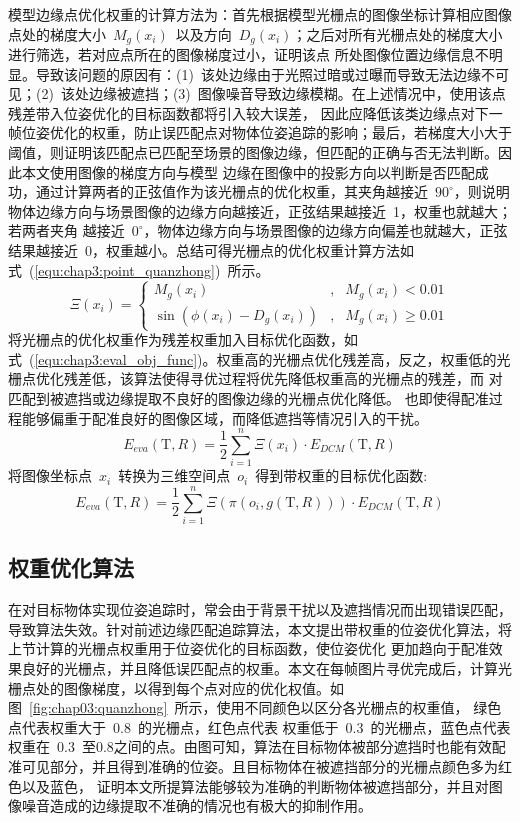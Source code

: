 模型边缘点优化权重的计算方法为：首先根据模型光栅点的图像坐标计算相应图像点处的梯度大小~$M_g(x_i)$~以及方向~$D_g(x_i)$；之后对所有光栅点处的梯度大小进行筛选，若对应点所在的图像梯度过小，证明该点
所处图像位置边缘信息不明显。导致该问题的原因有：(1)~该处边缘由于光照过暗或过曝而导致无法边缘不可见；(2)~该处边缘被遮挡；(3)~图像噪音导致边缘模糊。在上述情况中，使用该点残差带入位姿优化的目标函数都将引入较大误差，
因此应降低该类边缘点对下一帧位姿优化的权重，防止误匹配点对物体位姿追踪的影响；最后，若梯度大小大于阈值，则证明该匹配点已匹配至场景的图像边缘，但匹配的正确与否无法判断。因此本文使用图像的梯度方向与模型
边缘在图像中的投影方向以判断是否匹配成功，通过计算两者的正弦值作为该光栅点的优化权重，其夹角越接近~$90^\circ$，则说明物体边缘方向与场景图像的边缘方向越接近，正弦结果越接近~1，权重也就越大；若两者夹角
越接近~$0^\circ$，物体边缘方向与场景图像的边缘方向偏差也就越大，正弦结果越接近~0，权重越小。总结可得光栅点的优化权重计算方法如式~(\ref{equ:chap3:point_quanzhong})~所示。
\begin{equation}
  \label{equ:chap3:point_quanzhong}
  \Xi (x_i)=
  \left\{
    \begin{aligned}{}
    M_g(x_i)&,&M_g(x_i) < 0.01 \\
    \sin (\phi(x_i)-D_g(x_i))&,&M_g(x_i) \geq 0.01
    \end{aligned}
    \right.
\end{equation}
将光栅点的优化权重作为残差权重加入目标优化函数，如式~(\ref{equ:chap3:eval_obj_func})。权重高的光栅点优化残差高，反之，权重低的光栅点优化残差低，该算法使得寻优过程将优先降低权重高的光栅点的残差，而
对匹配到被遮挡或边缘提取不良好的图像边缘的光栅点优化降低。
也即使得配准过程能够偏重于配准良好的图像区域，而降低遮挡等情况引入的干扰。
\begin{equation}
\label{equ:chap3:eval_obj_func}
E_{eva}(\textrm{T},R)=\frac{1}{2}\sum_{i=1}^n \Xi(x_i)\cdot E_{DCM}(\textrm{T},R)
\end{equation}
将图像坐标点~$x_i$~转换为三维空间点~$o_i$~得到带权重的目标优化函数:
\begin{equation}
  \label{equ:chap3:eval_obj_func_oi}
  E_{eva}(\textrm{T},R)=\frac{1}{2}\sum_{i=1}^n \Xi(\pi (o_i,g(\textrm{T},R)))\cdot E_{DCM}(\textrm{T},R)
  \end{equation}
\subsection{权重优化算法}
\label{sec:Weight optimization algorithm2}
在对目标物体实现位姿追踪时，常会由于背景干扰以及遮挡情况而出现错误匹配，导致算法失效。针对前述边缘匹配追踪算法，本文提出带权重的位姿优化算法，将上节计算的光栅点权重用于位姿优化的目标函数，使位姿优化
更加趋向于配准效果良好的光栅点，并且降低误匹配点的权重。本文在每帧图片寻优完成后，计算光栅点处的图像梯度，以得到每个点对应的优化权值。如图~\ref{fig:chap03:quanzhong}~所示，使用不同颜色以区分各光栅点的权重值，
绿色点代表权重大于~0.8~的光栅点，红色点代表
权重低于~0.3~的光栅点，蓝色点代表权重在~0.3~至0.8之间的点。由图可知，算法在目标物体被部分遮挡时也能有效配准可见部分，并且得到准确的位姿。且目标物体在被遮挡部分的光栅点颜色多为红色以及蓝色，
证明本文所提算法能够较为准确的判断物体被遮挡部分，并且对图像噪音造成的边缘提取不准确的情况也有极大的抑制作用。

